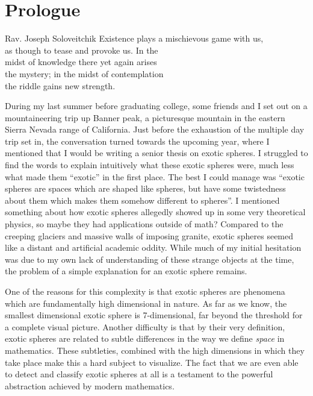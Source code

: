 \chapter*{Prologue}

\begin{epigraph}{19.5em}{Rav. Joseph Soloveitchik}
	Existence plays a mischievous game with us,\\
	as though to tease and provoke us. In the \\
	midst of knowledge there yet again arises \\
	the mystery; in the midst of contemplation\\
	the riddle gains new strength.
\end{epigraph}

During my last summer before graduating college, some friends and I set out on a mountaineering trip up Banner peak, a picturesque mountain in the eastern Sierra Nevada range of California. Just before the exhaustion of the multiple day trip set in, the conversation turned towards the upcoming year, where I mentioned that I would be writing a senior thesis on exotic spheres.
I struggled to find the words to explain intuitively what these exotic spheres were, much less what made them ``exotic'' in the first place.
The best I could manage was ``exotic spheres are spaces which are shaped like spheres, but have some twistedness about them which makes them somehow different to spheres''. I mentioned something about how exotic spheres allegedly showed up in some very theoretical physics, so maybe they had applications outside of math?
Compared to the creeping glaciers and massive walls of imposing granite, exotic spheres seemed like a distant and artificial academic oddity.
While much of my initial hesitation was due to my own lack of understanding of these strange objects at the time, the problem of a simple explanation for an exotic sphere remains.

One of the reasons for this complexity is that exotic spheres are phenomena which are fundamentally high dimensional in nature. As far as we know, the smallest dimensional exotic sphere is 7-dimensional, far beyond the threshold for a complete visual picture. Another difficulty is that by their very definition, exotic spheres are related to subtle differences in the way we define \emph{space} in mathematics. These subtleties, combined with the high dimensions in which they take place make this a hard subject to visualize. The fact that we are even able to detect and classify exotic spheres at all is a testament to the powerful abstraction achieved by modern mathematics.

